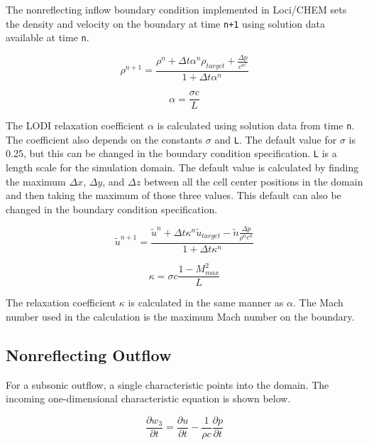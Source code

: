 \documentclass{article}
\begin{document}
The nonreflecting inflow boundary condition implemented in Loci/CHEM sets the density and velocity on the boundary at time {\tt n+1} using solution data available at time {\tt n}. 

\begin{equation}
\rho^{n+1} = \frac{\rho^n + \Delta t \alpha^n \rho_{target} + \frac{\Delta p}{c^{n^2}}}{1 + \Delta t \alpha^n}
\end{equation}

\begin{equation}
\alpha = \frac{\sigma c}{L}
\end{equation}

The LODI relaxation coefficient {\tt $\alpha$} is calculated using solution data from time {\tt n}. The coefficient also depends on the constants {\tt $\sigma$} and {\tt L}. The default value for {\tt $\sigma$} is 0.25, but this can be changed in the boundary condition specification. {\tt L} is a length scale for the simulation domain. The default value is calculated by finding the maximum {\tt $\Delta x$}, {\tt $\Delta y $}, and {\tt $\Delta z$} between all the cell center positions in the domain and then taking the maximum of those three values. This default can also be changed in the boundary condition specification.

\begin{equation}
\tilde{u}^{n+1} = \frac{\tilde{u}^n + \Delta t \kappa^n \tilde{u}_{target} - \tilde{n} \frac{\Delta p}{\rho^n c^n}}{1 + \Delta t \kappa^n}
\end{equation}

\begin{equation}
\kappa = \sigma c \frac{1 - M^{2}_{max}}{L}
\end{equation}

The relaxation coefficient {\tt $\kappa$} is calculated in the same manner as {\tt $\alpha$}. The Mach number used in the calculation is the maximum Mach number on the boundary.

\subsection{Nonreflecting Outflow}

For a subsonic outflow, a single characteristic points into the domain. The incoming one-dimensional characteristic equation is shown below.

\begin{equation}
\frac{\partial w_3}{\partial t} = \frac{\partial u}{\partial t} - \frac{1}{\rho c} \frac{\partial p}{\partial t}
\end{equation}
\end{document}
